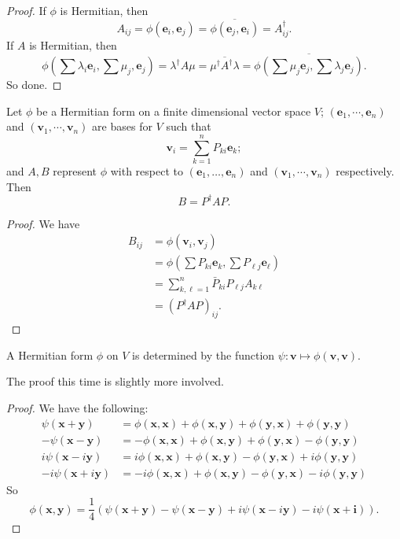 \documentclass[a4paper]{article}
\begin{document}
\begin{proof}
  If $\phi$ is Hermitian, then
  \[
    A_{ij} = \phi(\mathbf{e}_i, \mathbf{e}_j) = \overline{\phi(\mathbf{e}_j, \mathbf{e}_i)} = A^{\dagger}_{ij}.
  \]
  If $A$ is Hermitian, then
  \[
    \phi\left(\sum \lambda_i \mathbf{e}_i, \sum \mu_j, \mathbf{e}_j\right) = \lambda^\dagger A \mu = \overline{\mu^\dagger A^\dagger \lambda} = \overline{\phi\left(\sum \mu_j \mathbf{e}_j, \sum \lambda_j \mathbf{e}_j\right)}.
  \]
  So done.
\end{proof}

\begin{prop}
  Let $\phi$ be a Hermitian form on a finite dimensional vector space $V$; $(\mathbf{e}_1, \cdots, \mathbf{e}_n)$ and $(\mathbf{v}_1, \cdots, \mathbf{v}_n)$ are bases for $V$ such that
  \[
    \mathbf{v}_i = \sum_{k = 1}^n P_{ki} \mathbf{e}_k;
  \]
  and $A, B$ represent $\phi$ with respect to $(\mathbf{e}_1, \ldots, \mathbf{e}_n)$ and $(\mathbf{v}_1, \cdots, \mathbf{v}_n)$ respectively. Then
  \[
    B = P^\dagger AP.
  \]
\end{prop}

\begin{proof}
  We have
  \begin{align*}
    B_{ij} &= \phi(\mathbf{v}_i, \mathbf{v}_j) \\
    &= \phi\left(\sum P_{ki} \mathbf{e}_k, \sum P_{\ell j} \mathbf{e}_\ell\right)\\
    &= \sum_{k, \ell = 1}^n \bar{P}_{ki} P_{\ell j} A_{k\ell}\\
    &= (P^\dagger AP)_{ij}.
  \end{align*}
\end{proof}

\begin{lemma}
  A Hermitian form $\phi$ on $V$ is determined by the function $\psi: \mathbf{v} \mapsto \phi(\mathbf{v}, \mathbf{v})$.
\end{lemma}

The proof this time is slightly more involved.
\begin{proof}
  We have the following:
  \begin{align*}
    \psi(\mathbf{x} + \mathbf{y}) &= \phi(\mathbf{x}, \mathbf{x}) + \phi(\mathbf{x}, \mathbf{y}) + \phi(\mathbf{y}, \mathbf{x}) + \phi(\mathbf{y}, \mathbf{y})\\
   -\psi(\mathbf{x} - \mathbf{y}) &= -\phi(\mathbf{x}, \mathbf{x}) + \phi(\mathbf{x}, \mathbf{y}) + \phi(\mathbf{y}, \mathbf{x}) - \phi(\mathbf{y}, \mathbf{y})\\
   i\psi(\mathbf{x} -i\mathbf{y}) &= i\phi(\mathbf{x}, \mathbf{x}) + \phi(\mathbf{x}, \mathbf{y}) - \phi(\mathbf{y}, \mathbf{x}) +i\phi(\mathbf{y}, \mathbf{y})\\
  -i\psi(\mathbf{x} +i\mathbf{y}) &=-i\phi(\mathbf{x}, \mathbf{x}) + \phi(\mathbf{x}, \mathbf{y}) - \phi(\mathbf{y}, \mathbf{x}) -i\phi(\mathbf{y}, \mathbf{y})
  \end{align*}
  So
  \[
    \phi(\mathbf{x}, \mathbf{y}) = \frac{1}{4}(\psi(\mathbf{x} + \mathbf{y}) - \psi(\mathbf{x} - \mathbf{y}) + i\psi(\mathbf{x} - i\mathbf{y}) - i \psi(\mathbf{x} + \mathbf{i})).
  \]
\end{proof}
\end{document}
